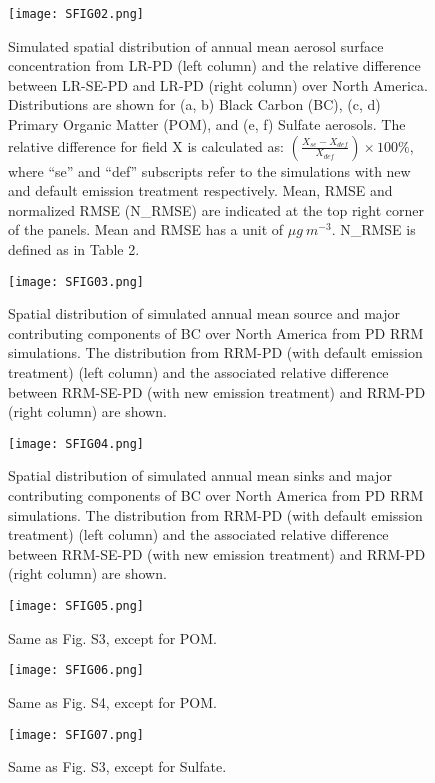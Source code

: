 \documentclass[journal abbreviation, manuscript]{copernicus}
\begin{document}
\clearpage
\begin{figure}[t]
\texttt{[image: SFIG02.png]}
\caption{Simulated spatial distribution of annual mean aerosol surface concentration from LR-PD (left column) and the relative difference between LR-SE-PD and LR-PD (right column) over North America. Distributions are shown for (a, b) Black Carbon (BC), (c, d) Primary Organic Matter (POM), and (e, f) Sulfate aerosols. The relative difference for field X is calculated as: $(\frac{X_{se}-X_{def}}{X_{def}}) \times 100 \%$, where “se” and “def” subscripts refer to the simulations with new and default emission treatment respectively. Mean, RMSE and normalized RMSE (N\_RMSE) are indicated at the top right corner of the panels. Mean and RMSE has a unit of $\mu{g}\ m^{-3}$. N\_RMSE is defined as in Table 2. }
\end{figure}

\clearpage
\begin{figure}[t]
\texttt{[image: SFIG03.png]}
\caption{Spatial distribution of simulated annual mean source and major contributing components of BC over North America from PD RRM simulations. The distribution from RRM-PD (with default emission treatment) (left column) and the associated relative difference between RRM-SE-PD (with new emission treatment) and RRM-PD (right column) are shown. }
\end{figure}

\clearpage
\begin{figure}[t]
\texttt{[image: SFIG04.png]}
\caption{Spatial distribution of simulated annual mean sinks and major contributing components of BC over North America from PD RRM simulations. The distribution from RRM-PD (with default emission treatment) (left column) and the associated relative difference between RRM-SE-PD (with new emission treatment) and RRM-PD (right column) are shown. }
\end{figure}

\clearpage
\begin{figure}[t]
\texttt{[image: SFIG05.png]}
\caption{Same as Fig. S3, except for POM. }
\end{figure}

\clearpage
\begin{figure}[t]
\texttt{[image: SFIG06.png]}
\caption{Same as Fig. S4, except for POM. }
\end{figure}

\clearpage
\begin{figure}[t]
\texttt{[image: SFIG07.png]}
\caption{Same as Fig. S3, except for Sulfate. }
\end{figure}
\end{document}
